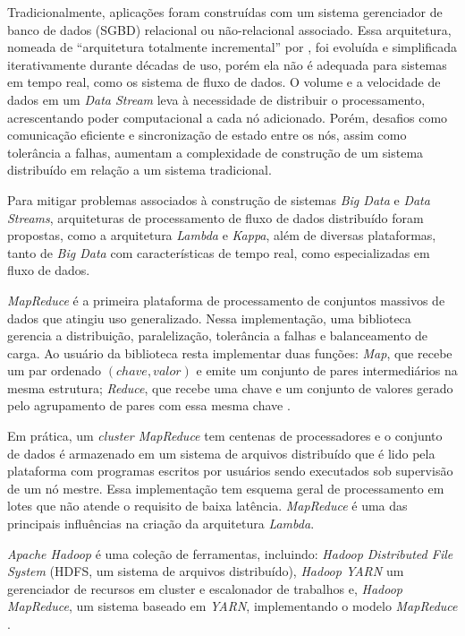Tradicionalmente, aplicações
foram construídas com um sistema gerenciador de
banco de dados (SGBD) relacional ou não-relacional associado.
Essa arquitetura,
nomeada de ``arquitetura totalmente incremental'' por ,
foi evoluída e simplificada iterativamente durante décadas de uso, porém ela não
é adequada para sistemas em tempo real, como os sistema de fluxo de dados.
O volume e a velocidade de dados em um \emph{Data Stream} leva à necessidade de
distribuir o processamento, acrescentando poder computacional a cada nó
adicionado.
Porém, desafios como comunicação eficiente e sincronização de estado
entre os nós, assim como tolerância a falhas, aumentam a complexidade de
construção de um sistema distribuído em relação a um sistema tradicional.

\newcommand{\lambdaa}{\xspace\emph{Lambda}\xspace}
\newcommand{\kappaa}{\xspace\emph{Kappa}\xspace}

Para mitigar problemas associados à construção de sistemas \emph{Big Data}
e \emph{Data Streams},
arquiteturas de processamento de fluxo
de dados distribuído foram propostas, como a arquitetura \lambdaa
\cite{marz2015big} e \kappaa \cite{Kreps2014}, além
de
diversas plataformas, tanto de \emph{Big Data} com características de tempo real,
como especializadas em fluxo de dados.

\emph{MapReduce} é a primeira plataforma de processamento de conjuntos massivos
de dados que atingiu uso generalizado.
Nessa implementação, uma biblioteca gerencia a distribuição, paralelização,
tolerância a falhas e balanceamento de carga.
Ao usuário da biblioteca resta implementar duas funções:
\emph{Map}, que recebe um par ordenado
$(chave, valor)$ e emite um conjunto de pares intermediários na mesma estrutura;
\emph{Reduce}, que recebe uma chave e um conjunto de valores gerado pelo agrupamento
de pares com essa mesma chave \cite{Dean2004}.

Em prática, um \emph{cluster MapReduce} tem centenas de processadores e o
conjunto de dados é armazenado em um sistema de arquivos distribuído que é lido
pela plataforma com programas escritos por usuários sendo executados sob
supervisão de um nó mestre.
Essa implementação tem esquema geral de processamento em lotes que não atende o
requisito de baixa latência.
\nobreakdash \emph{MapReduce} é uma das principais influências na criação da arquitetura
\lambdaa \cite{marz2015big}.

\emph{Apache Hadoop} é uma coleção de ferramentas, incluindo: \emph{Hadoop
Distributed File System} (HDFS, um sistema de arquivos distribuído), \emph{Hadoop
YARN} um gerenciador de recursos em cluster e escalonador de trabalhos e,
\emph{Hadoop MapReduce}, um sistema baseado em \emph{YARN}, implementando o modelo
\emph{MapReduce} \cite{ApacheHadoop2020}.

